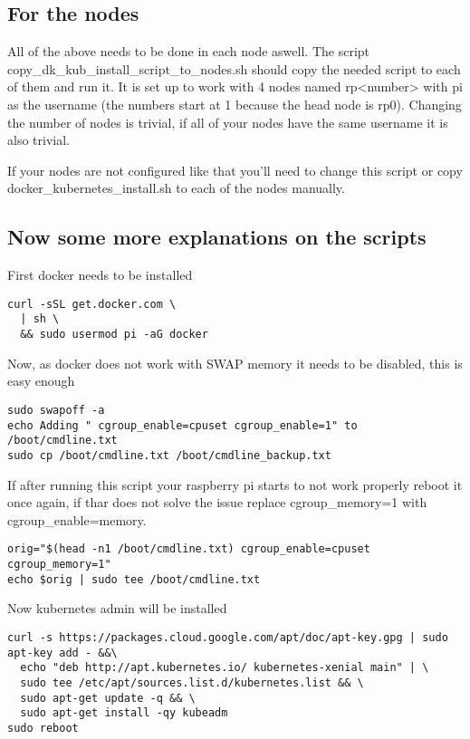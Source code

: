 \subsection{For the nodes}

All of the above needs to be done in each node aswell. The script
copy\_dk\_kub\_install\_script\_to\_nodes.sh should copy the needed
script to each of them and run it. It is set up to work with 4 nodes
named rp\textless{}number\textgreater{} with pi as the username (the
numbers start at 1 because the head node is rp0). Changing the number of
nodes is trivial, if all of your nodes have the same username it is also
trivial.

If your nodes are not configured like that you'll need to change this
script or copy docker\_kubernetes\_install.sh to each of the nodes
manually.

\subsection{Now some more explanations on the scripts}

First docker needs to be installed

\begin{lstlisting}
curl -sSL get.docker.com \
  | sh \
  && sudo usermod pi -aG docker
\end{lstlisting}

Now, as docker does not work with SWAP memory it needs to be disabled,
this is easy enough

\begin{lstlisting}
sudo swapoff -a 
echo Adding " cgroup_enable=cpuset cgroup_enable=1" to /boot/cmdline.txt
sudo cp /boot/cmdline.txt /boot/cmdline_backup.txt
\end{lstlisting}

If after running this script your raspberry pi starts to not work
properly reboot it once again, if thar does not solve the issue replace
cgroup\_memory=1 with cgroup\_enable=memory.

\begin{lstlisting}
orig="$(head -n1 /boot/cmdline.txt) cgroup_enable=cpuset cgroup_memory=1"
echo $orig | sudo tee /boot/cmdline.txt
\end{lstlisting}

Now kubernetes admin will be installed

\begin{lstlisting}
curl -s https://packages.cloud.google.com/apt/doc/apt-key.gpg | sudo apt-key add - &&\
  echo "deb http://apt.kubernetes.io/ kubernetes-xenial main" | \
  sudo tee /etc/apt/sources.list.d/kubernetes.list && \
  sudo apt-get update -q && \
  sudo apt-get install -qy kubeadm
sudo reboot 
\end{lstlisting}

